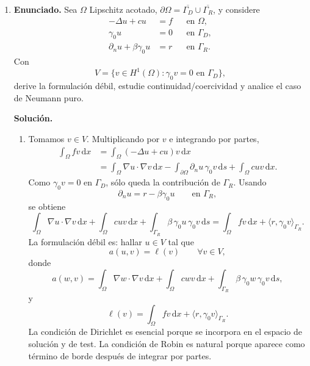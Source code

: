 \documentclass[11pt]{article}
\def\dx{\mbox{\(\,\mathrm{d}x\)}}
\def\ds{\mbox{\(\,\mathrm{d}s\)}}
\begin{document}
\begin{enumerate}[label=\textbf{\arabic*.}, leftmargin=*]

    \item \textbf{Enunciado.} Sea $\Omega$ Lipschitz acotado, $\partial\Omega=\overline{\Gamma_D}\cup\overline{\Gamma_R}$, y considere
    \[
    \begin{aligned}
        -\Delta u+cu&=f &&\text{en }\Omega,\\
        \gamma_0u&=0 &&\text{en }\Gamma_D,\\
        \partial_nu+\beta\gamma_0u&=r &&\text{en }\Gamma_R.
    \end{aligned}
    \]
    Con
    \[
        V=\{v\in H^1(\Omega):\gamma_0v=0\text{ en }\Gamma_D\},
    \]
    derive la formulación débil, estudie continuidad/coercividad y analice el caso de Neumann puro.

    \textbf{Solución.}
    \begin{enumerate}[label=(\alph*)]
        \item Tomamos $v\in V$. Multiplicando por $v$ e integrando por partes,
        \begin{align*}
            \int_\Omega fv\dx
            &=
            \int_\Omega (-\Delta u+cu)v\dx\\
            &=
            \int_\Omega \nabla u\cdot\nabla v\dx
            -\int_{\partial\Omega}\partial_nu\,\gamma_0v\ds
            +\int_\Omega cuv\dx.
        \end{align*}
        Como $\gamma_0v=0$ en $\Gamma_D$, sólo queda la contribución de $\Gamma_R$. Usando
        \[
            \partial_nu=r-\beta\gamma_0u\qquad\text{en }\Gamma_R,
        \]
        se obtiene
        \[
            \int_\Omega \nabla u\cdot\nabla v\dx
            +\int_\Omega cuv\dx
            +\int_{\Gamma_R}\beta\,\gamma_0u\,\gamma_0v\ds
            =
            \int_\Omega fv\dx
            +\langle r,\gamma_0v\rangle_{\Gamma_R}.
        \]
        La formulación débil es: hallar $u\in V$ tal que
        \[
            a(u,v)=\ell(v)\qquad\forall v\in V,
        \]
        donde
        \[
            a(w,v)=
            \int_\Omega \nabla w\cdot\nabla v\dx
            +\int_\Omega cwv\dx
            +\int_{\Gamma_R}\beta\,\gamma_0w\,\gamma_0v\ds,
        \]
        y
        \[
            \ell(v)=
            \int_\Omega fv\dx
            +\langle r,\gamma_0v\rangle_{\Gamma_R}.
        \]
        La condición de Dirichlet es esencial porque se incorpora en el espacio de solución y de test. La condición de Robin es natural porque aparece como término de borde después de integrar por partes.


\end{enumerate}
\end{enumerate}
\end{document}
